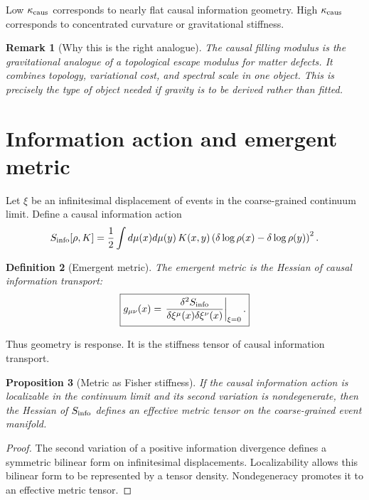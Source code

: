 \documentclass[11pt]{article}
\newtheorem{definition}{Definition}[section]
\newtheorem{proposition}[definition]{Proposition}
\newtheorem{remark}[definition]{Remark}
\begin{document}
Low $\kappa_{\rm caus}$ corresponds to nearly flat causal information geometry. High $\kappa_{\rm caus}$ corresponds to concentrated curvature or gravitational stiffness.

\begin{remark}[Why this is the right analogue]
The causal filling modulus is the gravitational analogue of a topological escape modulus for matter defects. It combines topology, variational cost, and spectral scale in one object. This is precisely the type of object needed if gravity is to be derived rather than fitted.
\end{remark}

\section{Information action and emergent metric}

Let $\xi$ be an infinitesimal displacement of events in the coarse-grained continuum limit. Define a causal information action
\begin{equation}
S_{\rm info}[\rho,K]=\frac12\int d\mu(x)d\mu(y)\,K(x,y)
\left(\delta\log\rho(x)-\delta\log\rho(y)\right)^2.
\end{equation}

\begin{definition}[Emergent metric]
The emergent metric is the Hessian of causal information transport:
\begin{equation}
\boxed{g_{\mu\nu}(x)=\left.\frac{\delta^2S_{\rm info}}{\delta\xi^\mu(x)\delta\xi^\nu(x)}\right|_{\xi=0}.}
\end{equation}
\end{definition}

Thus geometry is response. It is the stiffness tensor of causal information transport.

\begin{proposition}[Metric as Fisher stiffness]
If the causal information action is localizable in the continuum limit and its second variation is nondegenerate, then the Hessian of $S_{\rm info}$ defines an effective metric tensor on the coarse-grained event manifold.
\end{proposition}

\begin{proof}
The second variation of a positive information divergence defines a symmetric bilinear form on infinitesimal displacements. Localizability allows this bilinear form to be represented by a tensor density. Nondegeneracy promotes it to an effective metric tensor.
\end{proof}
\end{document}
